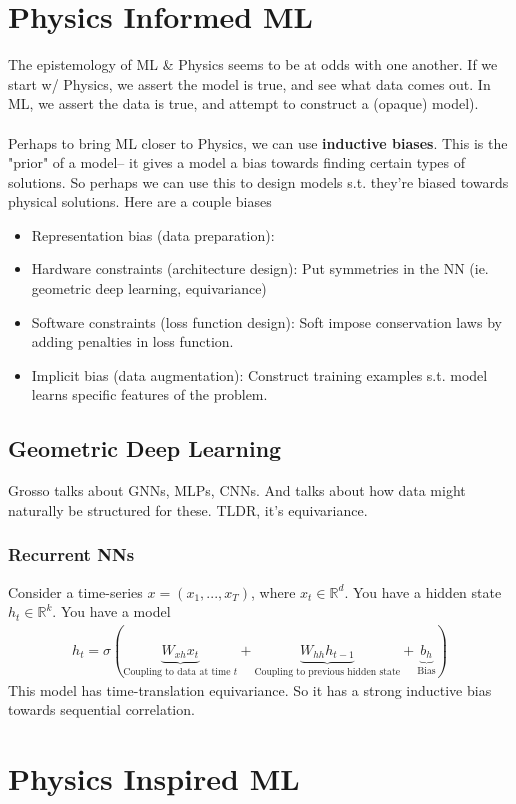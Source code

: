 \section{Physics Informed ML}
The epistemology of ML \& Physics seems to be at odds with one another. If we start w/ Physics, we assert the model is true, and see what data comes out. In ML, we assert the data is true, and attempt to construct a (opaque) model).\\
\\
Perhaps to bring ML closer to Physics, we can use \textbf{inductive biases}. This is the "prior" of a model-- it gives a model a bias towards finding certain types of solutions. So perhaps we can use this to design models s.t. they're biased towards physical solutions. Here are a couple biases
\begin{itemize}
	\item Representation bias (data preparation):
	\item Hardware constraints (architecture design): Put symmetries in the NN (ie. geometric deep learning, equivariance)
	\item Software constraints (loss function design): Soft impose conservation laws by adding penalties in loss function.
	\item Implicit bias (data augmentation): Construct training examples s.t. model learns specific features of the problem.
\end{itemize}
\subsection{Geometric Deep Learning}
Grosso talks about GNNs, MLPs, CNNs. And talks about how data might naturally be structured for these. TLDR, it's equivariance.

\subsubsection{Recurrent NNs}
Consider a time-series $x = (x_1,..., x_T)$, where $x_t \in \mathbb R^d$. You have a hidden state $h_t \in \mathbb R^k$. You have a model
\begin{align}
	h_t = \sigma(\underbrace{W_{x h} x_t}_{\text{Coupling to data at time $t$}} + \underbrace{W_{hh} h_{t-1}}_{\text{Coupling to previous hidden state}} + \underbrace{b_h}_{\text{Bias}})
\end{align}
This model has time-translation equivariance. So it has a strong inductive bias towards sequential correlation.



\section{Physics Inspired ML}
